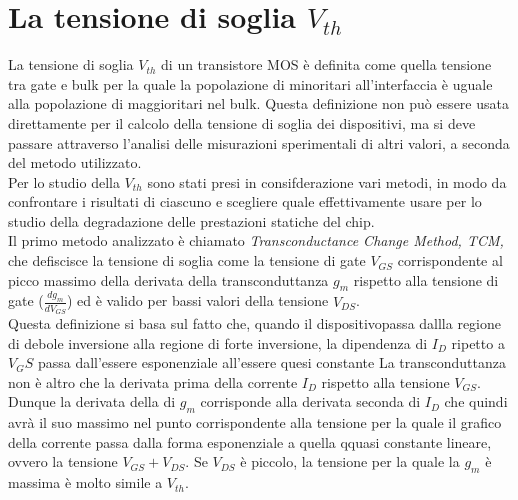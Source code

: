 \documentclass[12pt, letterpaper]{book}
\begin{document}
\chapter{La tensione di soglia $V_{th}$}

La tensione di soglia $V_{th}$ di un transistore MOS è definita come quella tensione tra gate e bulk per la quale la popolazione di minoritari all’interfaccia è uguale alla popolazione di maggioritari nel bulk. Questa definizione non può essere usata direttamente per il calcolo della tensione di soglia dei dispositivi, ma si deve passare attraverso l'analisi delle misurazioni sperimentali di altri valori, a seconda del metodo utilizzato. \\	
Per lo studio della $V_{th}$ sono stati presi in consifderazione vari metodi, in modo da confrontare i risultati di ciascuno e scegliere quale effettivamente usare per lo studio della degradazione delle prestazioni statiche del chip.\\

Il primo metodo analizzato è chiamato \emph{Transconductance Change Method, TCM,} che defiscisce la tensione di soglia come la tensione di gate $V_{GS}$ corrispondente al picco massimo della derivata della transconduttanza $g_m$ rispetto alla tensione di gate ($\frac{dg_m}{dV_ {GS}}$) ed è valido per bassi valori della tensione $V_{DS}$.\\
Questa definizione si basa sul fatto che, quando il dispositivopassa dallla regione di debole inversione alla regione di forte inversione, la dipendenza di $I_D$ ripetto a $V_GS$ passa dall'essere esponenziale all'essere quesi constante 
La transconduttanza non è altro che la derivata prima della corrente $I_D$ rispetto alla tensione $V_{GS}$. Dunque la derivata della di $g_m$ corrisponde alla derivata seconda di $I_D$ che quindi avrà il suo massimo nel punto corrispondente alla tensione per la quale il grafico della corrente passa dalla forma esponenziale a quella qquasi constante lineare, ovvero la tensione $V_{GS}+V_{DS}$. Se $V_{DS}$ è piccolo, la tensione per la quale la $g_m$ è massima è molto simile a $V_{th}$.\\
\end{document}
